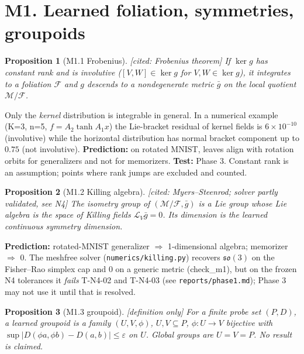 \documentclass[11pt]{article}
\newtheorem{prop}{Proposition}
\theoremstyle{remark}\newtheorem{rem}{Remark}
\newcommand{\status}[1]{\hfill\textsf{[#1]}}
\begin{document}
\section*{M1. Learned foliation, symmetries, groupoids}
\begin{prop}[M1.1 Frobenius]\status{cited: Frobenius theorem}
If $\ker g$ has constant rank and is involutive ($[V,W]\in\ker g$ for $V,W\in\ker g$), it integrates to a foliation $\mathcal F$ and $g$ descends to a nondegenerate metric $\bar g$ on the local quotient $\mathcal M/\mathcal F$.
\end{prop}
Only the \emph{kernel} distribution is integrable in general. In a numerical example (K=3, n=5, $f=A_2\tanh A_1x$) the Lie-bracket residual of kernel fields is $6\times10^{-10}$ (involutive) while the horizontal distribution has normal bracket component up to $0.75$ (not involutive). \textbf{Prediction:} on rotated MNIST, leaves align with rotation orbits for generalizers and not for memorizers. \textbf{Test:} Phase 3. Constant rank is an assumption; points where rank jumps are excluded and counted.

\begin{prop}[M1.2 Killing algebra]\status{cited: Myers--Steenrod; solver partly validated, see N4}
The isometry group of $(\mathcal M/\mathcal F,\bar g)$ is a Lie group whose Lie algebra is the space of Killing fields $\mathcal L_V\bar g=0$. Its dimension is the learned continuous symmetry dimension.
\end{prop}
\textbf{Prediction:} rotated-MNIST generalizer $\Rightarrow$ 1-dimensional algebra; memorizer $\Rightarrow$ 0. The meshfree solver (\texttt{numerics/killing.py}) recovers $\mathfrak{so}(3)$ on the Fisher--Rao simplex cap and 0 on a generic metric (check\_m1), but on the frozen N4 tolerances it \emph{fails} T-N4-02 and T-N4-03 (see \texttt{reports/phase1.md}); Phase 3 may not use it until that is resolved.

\begin{prop}[M1.3 groupoid]\status{definition only}
For a finite probe set $(P,D)$, a learned groupoid is a family $(U,V,\phi)$, $U,V\subseteq P$, $\phi:U\to V$ bijective with $\sup|D(\phi a,\phi b)-D(a,b)|\le\varepsilon$ on $U$. Global groups are $U=V=P$. No result is claimed.
\end{prop}
\end{document}
